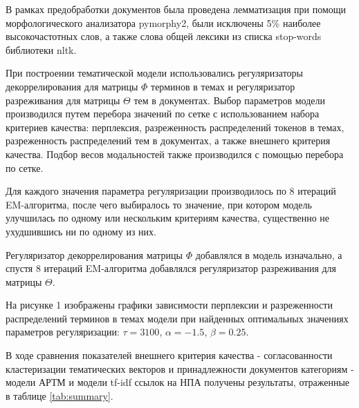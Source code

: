 \documentclass[12pt]{article}
\begin{document}
В рамках предобработки документов была проведена лемматизация при помощи морфологического анализатора pymorphy2, были исключены 5\% наиболее высокочастотных слов, а также слова общей лексики из списка stop-words библиотеки nltk.

При построении тематической модели использовались регуляризаторы декоррелирования для матрицы $\Phi$ терминов в темах и регуляризатор разреживания для матрицы $\Theta$ тем в документах. Выбор параметров модели производился путем перебора значений по сетке с использованием набора критериев качества: перплексия, разреженность распределений токенов в темах, разреженность распределений тем в документах, а также внешнего критерия качества. Подбор весов модальностей также производился с помощью перебора по сетке.

Для каждого значения параметра регуляризации производилось по 8 итераций EM-алгоритма, после чего выбиралось то значение, при котором модель улучшилась по одному или нескольким критериям качества, существенно не ухудшившись ни по одному из них. 

Регуляризатор декоррелирования матрицы $\Phi$ добавлялся в модель изначально, а спустя 8 итераций EM-алгоритма добавлялся регуляризатор разреживания для матрицы $\Theta$. 

На рисунке 1 изображены графики зависимости перплексии и разреженности распределений терминов в темах модели при найденных оптимальных значениях параметров регуляризации: $\tau = 3100$, $\alpha = -1.5$, $\beta = 0.25$.

В ходе сравнения показателей внешнего критерия качества - согласованности кластеризации тематических векторов и принадлежности документов категориям - модели АРТМ и модели tf-idf ссылок на НПА получены результаты, отраженные в таблице \ref{tab:summary}.
\end{document}
